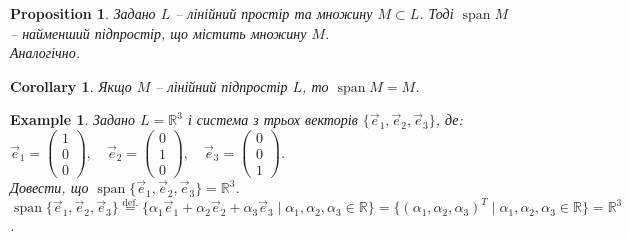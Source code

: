 \documentclass[a4paper, 10pt]{article}
\theoremstyle{theoremdd}
\newtheorem{example}[theorem]{Example}
\newtheorem{proposition}[theorem]{Proposition}
\newtheorem{remark}[theorem]{Remark}
\newtheorem{corollary}[theorem]{Corollary}
\DeclareMathOperator{\linspan}{span}
\begin{document}
	\begin{proposition}
	Задано $L$ -- лінійний простір та множину $M \subset L$. Тоді $\linspan M$ -- найменший підпростір, що містить множину $M$.\\
	\textit{Аналогічно.}
	\end{proposition}
	
	\begin{corollary}
	Якщо $M$ -- лінійний підпростір $L$, то $\linspan M = M$.
	\end{corollary}
	
	\begin{example}
	\label{find_span_of_elements}
	Задано $L = \mathbb{R}^3$ і система з трьох векторів $\{\vec{e}_1,\vec{e}_2,\vec{e}_3\}$, де:\\
	$\vec{e}_1 =\begin{pmatrix} 1\\ 0\\ 0 \end{pmatrix}, \quad \vec{e}_2 =\begin{pmatrix} 0\\ 1\\ 0 \end{pmatrix}, \quad \vec{e}_3 =\begin{pmatrix} 0\\ 0\\ 1 \end{pmatrix}$.\\
	Довести, що $\linspan\{\vec{e}_1, \vec{e}_2, \vec{e}_3\} = \mathbb{R}^3$.\\
	$\linspan\{\vec{e}_1, \vec{e}_2, \vec{e}_3\} \overset{\text{def.}}{=} \{\alpha_1 \vec{e}_1 + \alpha_2 \vec{e}_2 + \alpha_3 \vec{e}_3 \mid \alpha_1, \alpha_2, \alpha_3 \in \mathbb{R}\} = \{(\alpha_1, \alpha_2, \alpha_3)^T \mid \alpha_1, \alpha_2, \alpha_3 \in \mathbb{R}\} = \mathbb{R}^3$.
	\end{example}
	
	\iffalse
	\begin{remark}
	Трошки англійського означення. Там кажуть, що system $\{ x_n,\dots,x_n \}$ \textbf{spans} vector space $L$, if $\{x_1,\dots,x_n\} = L$. Адаптивного перекладу цього поки не знаю.
	\end{remark}
	\fi
		
\end{document}
